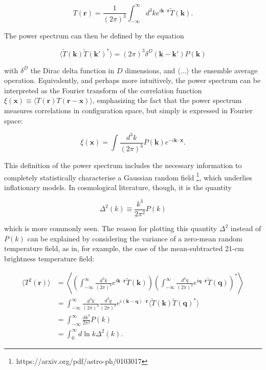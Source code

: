 \documentclass[floats,floatfix,showpacs,amssymb,prd,superscriptaddress,nofootinbib]{revtex4-2} %
\begin{document}
\begin{equation}
    T(\textbf{r}) = \frac{1}{(2 \pi)^3} \int^\infty _{-\infty} d^3 k e^{i \textbf{k} \cdot \textbf{r}} \tilde{T}(\textbf{k}).
\end{equation}

The power spectrum can then be defined by the equation

\begin{equation}
    \langle \tilde{T} (\textbf{k}) \tilde{T} (\textbf{k}') ^{*} \rangle = (2 \pi)^3 \delta^{D}  (\textbf{k} - \textbf{k}') P(\textbf{k})
\end{equation}

\noindent with $\delta^D$ the Dirac delta function in $D$ dimensions, and $\langle ... \rangle$ the ensemble average operation. Equivalently, and perhaps more intuitively, the power spectrum can be interpreted as the Fourier transform of the correlation function $\xi(\textbf{x}) \equiv \langle T(\textbf{r}) T(\textbf{r} - \textbf{x}) \rangle$, emphasizing the fact that the power spectrum measures correlations in configuration space, but simply is expressed in Fourier space:

\begin{equation}
    \xi(\textbf{x}) = \int \frac{d^3 k}{(2 \pi)^3} P(\textbf{k}) e^{-i \textbf{k} \cdot \textbf{x}}.
\end{equation}

This definition of the power spectrum includes the necessary information to completely statistically characterise a Gaussian random field \footnote{https://arxiv.org/pdf/astro-ph/0103017}, which underlies inflationary models. In cosmological literature, though, it is the quantity 

\begin{equation}
    \Delta^2 (k) \equiv \frac{k^3}{2\pi^2} P(k)
\end{equation}

\noindent which is more commonly seen. The reason for plotting this quantity $\Delta^2$ instead of $P(k)$ can be explained by considering the variance of a zero-mean random temperature field, as in, for example, the case of the mean-subtracted 21-cm brightness temperature field:

\begin{equation}
\begin{split}
    \langle T^2 (\textbf{r}) \rangle
    & = \left\langle \left( \int^\infty _{-\infty} \frac{d^3 k}{(2\pi)^3} e^{i \textbf{k} \cdot \textbf{r}} \tilde{T} (\textbf{k}) \right) \left( \int^\infty _{-\infty} \frac{d^3 q}{(2\pi)^3} e^{i \textbf{q} \cdot \textbf{r}} \tilde{T} (\textbf{q}) \right)^{*} \right\rangle \\
    & = \int^\infty _{-\infty} \frac{d^3 k}{(2\pi)^3} \frac{d^3 q}{(2\pi)^3} e^{i (\textbf{k} - \textbf{q}) \cdot \textbf{r}} \langle \tilde{T} (\textbf{k}) \tilde{T} (\textbf{q})^{*} \rangle \\
    & = \int^\infty _{-\infty} \frac{dk^3}{2\pi^2} P(k) \\
    & = \int^\infty _{0} d \ln k \Delta^2 (k).
\end{split}
\end{equation}
\end{document}
